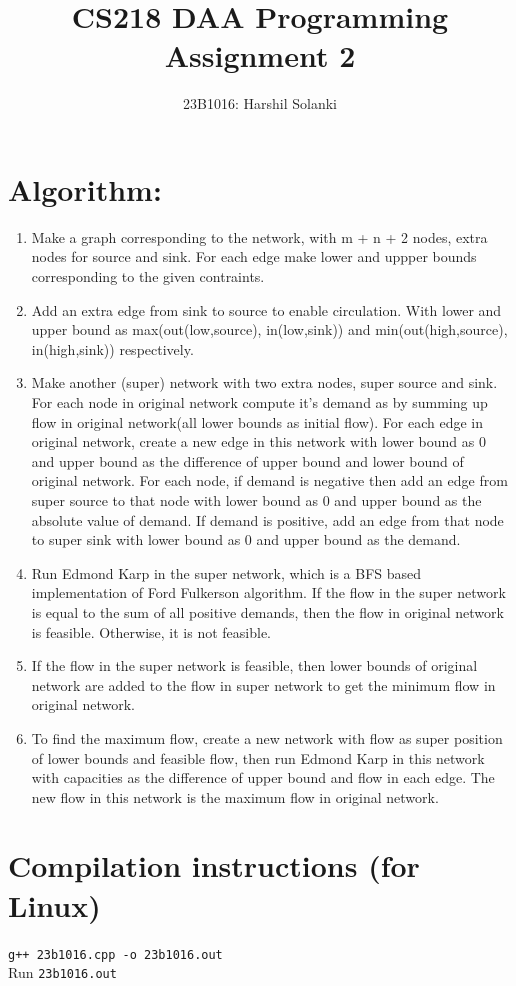 \documentclass{article}
\title{CS218 DAA Programming Assignment 2}
\author{23B1016: Harshil Solanki}
\begin{document}
 
\maketitle
\section*{Algorithm:}

\begin{enumerate}
    \item Make a graph corresponding to the network, with m + n + 2 nodes, extra nodes for source and sink. For each edge make lower and uppper bounds corresponding to the given contraints.
    \item Add an extra edge from sink to source to enable circulation. With lower and upper bound as max(out(low,source), in(low,sink)) and min(out(high,source), in(high,sink)) respectively.
    \item Make another (super) network with two extra nodes, super source and sink. For each node in original network compute it's demand as by summing up flow in original network(all lower bounds as initial flow). For each edge in original network, create a new edge in this network with lower bound as 0 and upper bound as the difference of upper bound and lower bound of original network. For each node, if demand is negative then add an edge from super source to that node with lower bound as 0 and upper bound as the absolute value of demand. If demand is positive, add an edge from that node to super sink with lower bound as 0 and upper bound as the demand.
    \item Run Edmond Karp in the super network, which is a BFS based implementation of Ford Fulkerson algorithm. If the flow in the super network is equal to the sum of all positive demands, then the flow in original network is feasible. Otherwise, it is not feasible.
    \item If the flow in the super network is feasible, then lower bounds of original network are added to the flow in super network to get the minimum flow in original network.
    \item To find the maximum flow, create a new network with flow as super position of lower bounds and feasible flow, then run Edmond Karp in this network with capacities as the difference of upper bound and flow in each edge. The new flow in this network is the maximum flow in original network.
\end{enumerate}

\section*{Compilation instructions (for Linux)}
\texttt{g++ 23b1016.cpp -o 23b1016.out}\\
Run \texttt{23b1016.out}
\end{document}
